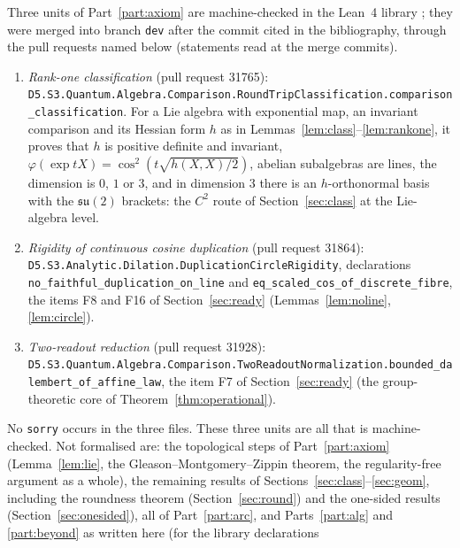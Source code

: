 \documentclass[11pt,reqno]{amsart}
\theoremstyle{definition}
\theoremstyle{remark}
\numberwithin{equation}{section}
\newcommand{\su}{\mathfrak{su}}
\begin{document}
Three units of Part~\ref{part:axiom} are machine-checked in the Lean~4 library \cite{Tru}; they were merged into branch \texttt{dev} after the
commit cited in the bibliography, through the pull requests named below (statements read at the merge commits).
\begin{enumerate}[label=(\alph*),leftmargin=2em]\sloppy
\item \emph{Rank-one classification} (pull request 31765): \texttt{D5.\allowbreak S3.\allowbreak Quantum.\allowbreak Algebra.\allowbreak Comparison.\allowbreak RoundTripClassification.\allowbreak comparison\_\allowbreak classification}.
For a Lie algebra with exponential map, an invariant comparison and its Hessian form $h$ as in Lemmas~\ref{lem:class}--\ref{lem:rankone}, it
proves that $h$ is positive definite and invariant, $\varphi(\exp tX)=\cos^2(t\sqrt{h(X,X)/2})$, abelian subalgebras are lines, the
dimension is $0$, $1$ or $3$, and in dimension $3$ there is an $h$-orthonormal basis with the $\su(2)$ brackets: the $C^2$ route of
Section~\ref{sec:class} at the Lie-algebra level.
\item \emph{Rigidity of continuous cosine duplication} (pull request 31864): \texttt{D5.\allowbreak S3.\allowbreak Analytic.\allowbreak Dilation.\allowbreak DuplicationCircleRigidity},
declarations \texttt{no\_\allowbreak faithful\_\allowbreak duplication\_\allowbreak on\_\allowbreak line} and \texttt{eq\_\allowbreak scaled\_\allowbreak cos\_\allowbreak of\_\allowbreak discrete\_\allowbreak fibre}, the items F8 and F16 of
Section~\ref{sec:ready} (Lemmas~\ref{lem:noline}, \ref{lem:circle}).
\item \emph{Two-readout reduction} (pull request 31928): \texttt{D5.\allowbreak S3.\allowbreak Quantum.\allowbreak Algebra.\allowbreak Comparison.\allowbreak TwoReadoutNormalization.\allowbreak bounded\_\allowbreak dalembert\_\allowbreak of\_\allowbreak affine\_\allowbreak law},
the item F7 of Section~\ref{sec:ready} (the group-theoretic core of Theorem~\ref{thm:operational}).
\end{enumerate}
No \texttt{sorry} occurs in the three files.  These three units are all that is machine-checked.  Not formalised are: the topological
steps of Part~\ref{part:axiom} (Lemma~\ref{lem:lie}, the Gleason--Montgomery--Zippin theorem, the regularity-free argument as a whole), the remaining results
of Sections~\ref{sec:class}--\ref{sec:geom}, including the roundness theorem (Section~\ref{sec:round}) and the one-sided results
(Section~\ref{sec:onesided}), all of Part~\ref{part:arc}, and Parts~\ref{part:alg} and \ref{part:beyond} as written here (for the library declarations
\end{document}
